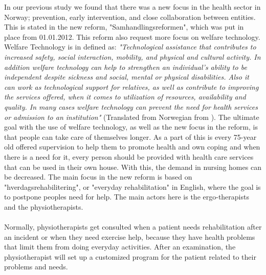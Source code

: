 In our previous study \cite{project} we found that there was a new focus in the health sector in Norway; prevention, early intervention, and close collaboration between entities. This is stated in the new reform, "Samhandlingsreformen", which was put in place from 01.01.2012. This reform also request more focus on welfare technology. Welfare Technology is in \cite{welfare} defined as: \emph{"Technological assistance that contributes to increased safety, social interaction, mobility,
and physical and cultural activity. In addition welfare technology can help to strengthen an individual's ability to be independent despite sickness and social, mental or physical disabilities. Also it can work as technological support for relatives, as well as contribute to improving the services offered, when it comes to utilization of resources, availability and quality. In many cases welfare technology can prevent the need for health services or admission to an institution"} (Translated from Norwegian from \cite{welfare}). The ultimate goal with the use of welfare technology, as well as the new focus in the reform, is that people can take care of themselves longer.  As a part of this is every 75-year old offered supervision to help them to promote health and own coping and when there is a need for it, every person should be provided with health care services that can be used in their own house. With this, the demand in nursing homes can be decreased. The main focus in the new reform is based on "hverdagsrehabilitering", or "everyday rehabilitation" in English, where the goal is to postpone peoples need for help. The main actors here is the ergo-therapists and the physiotherapists. \\ \\
Normally, physiotherapists get consulted when a patient needs rehabilitation after an incident or when they need exercise help, because they have health problems that limit them from doing everyday activities. After an examination, the physiotherapist will set up a customized program for the patient related to their problems and needs.\\ \\
